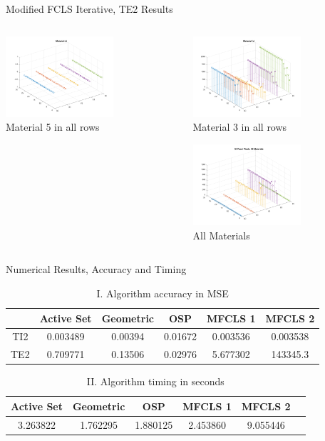 \documentclass{beamer}
\begin{document}
\begin{frame}{Modified FCLS Iterative, TE2 Results}
\begin{columns}
\begin{column}{0.33\textwidth}
        \includegraphics[width=4cm,center]{mfcls_te2_material_stem_5}
        \\ Material 5 in all rows
        \centering
    \end{column}
    \begin{column}{0.33\textwidth}
        \includegraphics[width=4cm,center]{mfcls_te2_material_stem_3}
        \\ Material 3 in all rows
        \centering

        \includegraphics[width=4cm,center]{mfcls_te2_allmaterials}
        \\ All Materials
        \centering
    \end{column}
\end{columns}
\end{frame}

\begin{frame}{Numerical Results, Accuracy and Timing}
\begin{table}[!h]
    \caption{I. Algorithm accuracy in MSE}
    \centering
    \begin{tabular}{|c|c|c|c|c|c|}
    \hline
        & Active Set & Geometric & OSP & MFCLS 1 & MFCLS 2 \\ \hline
    TI2 & 0.003489& 0.00394& 0.01672& 0.003536& 0.003538\\ \hline
    TE2 & 0.709771& 0.13506& 0.02976& 5.677302& 143345.3 \\ \hline
    \end{tabular}
\end{table}

\begin{table}[!h]
    \caption{II. Algorithm timing in seconds}
    \centering
    \begin{tabular}{|c|c|c|c|c|c|}
    \hline
     Active Set & Geometric & OSP & MFCLS 1 & MFCLS 2 \\ \hline
    3.263822& 1.762295& 1.880125&  2.453860& 9.055446 \\ \hline
    \end{tabular}
\end{table}
\end{frame}
\end{document}
